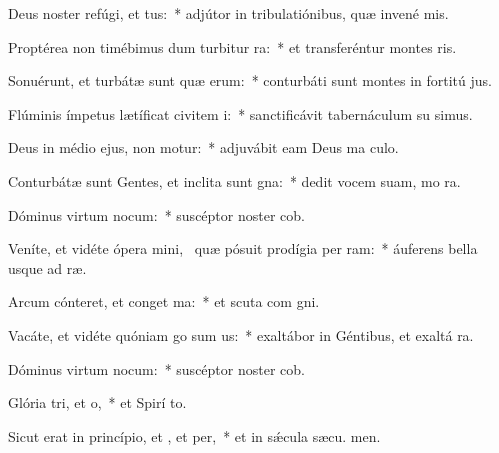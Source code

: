 \item Deus noster refúgi, et tus:~* adjútor in tribulatiónibus, quæ invené  mis.
\item Proptérea non timébimus dum turbitur ra:~* et transferéntur montes   ris.
\item Sonuérunt, et turbátæ sunt quæ erum:~* conturbáti sunt montes in fortitú jus.
\item Flúminis ímpetus lætíficat civitem i:~* sanctificávit tabernáculum su simus.
\item Deus in médio ejus, non motur:~* adjuvábit eam Deus ma culo.
\item Conturbátæ sunt Gentes, et inclita sunt gna:~* dedit vocem suam, mo  ra.
\item Dóminus virtum nocum:~* suscéptor noster  cob.
\item Veníte, et vidéte ópera mini,~\pscross{} quæ pósuit prodígia per ram:~* áuferens bella usque ad  ræ.
\item Arcum cónteret, et conget ma:~* et scuta com gni.
\item Vacáte, et vidéte quóniam go sum us:~* exaltábor in Géntibus, et exaltá  ra.
\item Dóminus virtum nocum:~* suscéptor noster  cob.
\item Glória tri, et o,~* et Spirí to.
\item Sicut erat in princípio, et , et per,~* et in sǽcula sæcu. men.
